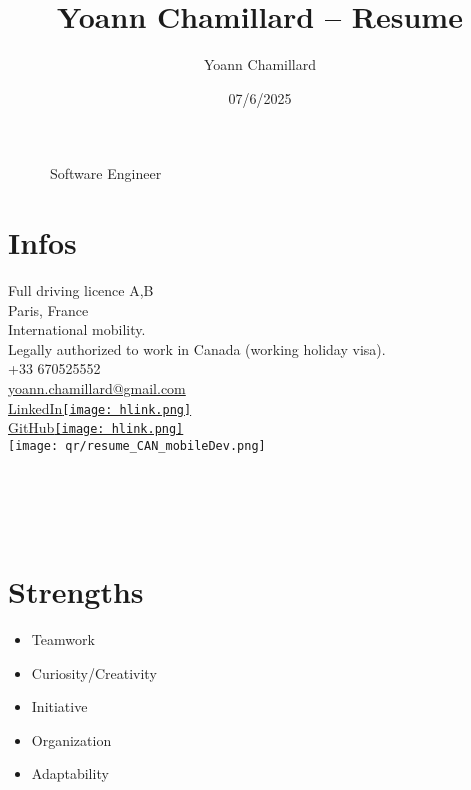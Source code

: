 \documentclass[]{friggeri-cv}
\title{Yoann Chamillard -- Resume}
\author{Yoann Chamillard}
\date{07/6/2025}
\begin{document}
      {~~~~~~Software Engineer}
      {}

\begin{aside}
\vspace{21mm}
\section{Infos}

Full driving licence A,B\\
\vspace{2.5mm}
Paris, France\\
\vspace{1.5mm}
International mobility.\\
\vspace*{0.6mm}Legally authorized to work in Canada (working holiday visa).\\
\vspace{2.5mm}
+33 670525552\\
\href{mailto:yoann.chamillard@gmail.com}{\small yoann.chamillard@gmail.com}\\
\vspace{2.5mm}
\href{https://www.linkedin.com/in/yoannchamillard/?locale=en_US}{LinkedIn\hspace{1.5mm}\texttt{[image: hlink.png]}}\\
\href{https://github.com/Nokheenig?tab=stars}{GitHub\hspace{1.5mm}\texttt{[image: hlink.png]}}\\
\vspace{2.5mm}
\texttt{[image: qr/resume\_CAN\_mobileDev.png]}\\
\vspace{2.5mm}
\\
\\
\\
\\
\vspace{2.5mm}%

\section{Strengths}
\begin{itemize}
\item Teamwork
\item Curiosity/Creativity
\item Initiative
\item Organization
\item Adaptability
\end{itemize}

\end{aside}
\end{document}
